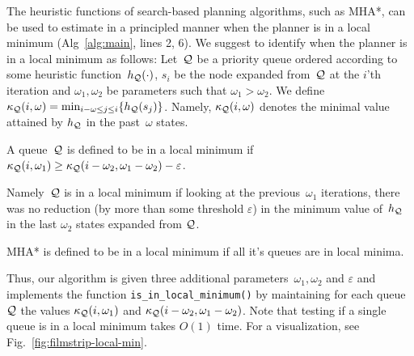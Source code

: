 \documentclass[conference]{IEEEtran}
\begin{document}

The heuristic functions of search-based planning algorithms, such as MHA*, can be used to estimate in a principled manner when the planner is in a local minimum (Alg~\ref{alg:main}, lines 2, 6). 
%
We suggest to identify when the planner is in a local minimum as follows:
Let~$\mathcal{Q}$ be a priority queue 
ordered according to some heuristic function~$h_{\mathcal{Q}}(\cdot)$,
$s_i$ be the node expanded from~$\mathcal{Q}$ at the $i$'th iteration and $\omega_1, \omega_2$ be parameters such that $\omega_1 > \omega_2$.
%
We define 
$\kappa_{\mathcal{Q}}(i, \omega) = \min_{i-\omega \leq j \leq i} \{ h_{\mathcal{Q}}(s_j)\}$.
Namely, $\kappa_{\mathcal{Q}}(i, \omega)$ denotes the minimal value attained by $h_{\mathcal{Q}}$ in the past~$\omega$ states. 
%
\begin{definition}
A queue~$\mathcal{Q}$ is defined to be in a local minimum if 
$\kappa_{\mathcal{Q}}(i, \omega_1) \geq \kappa_{\mathcal{Q}}(i - \omega_2, \omega_1 - \omega_2) - \varepsilon$.
\end{definition}
\noindent Namely~$\mathcal{Q}$ is in a local minimum if looking at the previous~$\omega_1$ iterations, 
there was no reduction 
(by more than some threshold $\varepsilon$) 
in the minimum value of~$h_{\mathcal{Q}}$ 
in the last $\omega_2$ states expanded from $\mathcal{Q}$.

\begin{definition}
MHA* is defined to be in a local minimum if 
all it's queues are in local minima.
\end{definition}

Thus, our algorithm is given three additional parameters~$\omega_1, \omega_2$ and $\varepsilon$ 
and implements the function \texttt{is\_in\_local\_minimum()} by maintaining for each queue~$\mathcal{Q}$ the values 
$\kappa_{\mathcal{Q}}(i, \omega_1)$ and $\kappa_{\mathcal{Q}}(i - \omega_2, \omega_1 - \omega_2)$.
Note that testing if a single queue is in a local minimum takes $O(1)$ time.
For a visualization, see Fig.~\ref{fig:filmstrip-local-min}.



%
\end{document}
